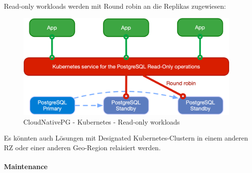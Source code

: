 \begin{flushleft}
    Read-only workloads werden mit Round robin an die Replikas zugewiesen:
    \begin{figure}[H]
        \centering
        \includegraphics[width=0.75\linewidth]{source/implementation/evaluation/postgresql_ha_solutions/cloudnativepg/cloudnativepg-architecture-read-only}
        \caption{CloudNativePG - Kubernetes - Read-only workloads}
        \label{fig:cloudnativepg-architecture-read-only}
    \end{figure}
\end{flushleft}
\begin{flushleft}
    Es könnten auch Lösungen mit Designated Kubernetes-Clustern in einem anderen RZ oder einer anderen Geo-Region relaisiert werden.
\end{flushleft}
\begin{flushleft}
    \paragraph{Maintenance}
\end{flushleft}